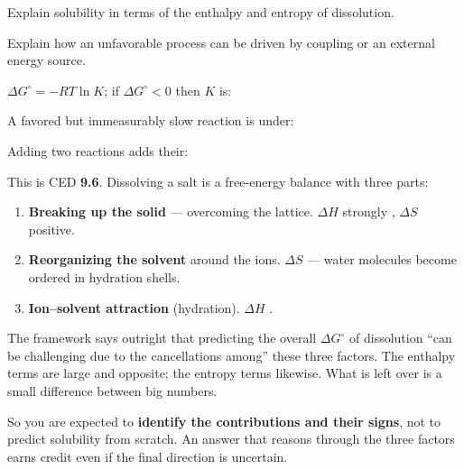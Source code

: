 \documentclass{apchem-notes}
\begin{document}

\begin{objectives}
  \item Explain solubility in terms of the enthalpy and entropy of
        dissolution.
  \item Explain how an unfavorable process can be driven by coupling or an
        external energy source.
\end{objectives}


\begin{warmup}[3]
  \item $\Delta G^\circ = -RT\ln K$; if $\Delta G^\circ < 0$ then $K$ is:
  \item A favored but immeasurably slow reaction is under:
  \item Adding two reactions adds their:
\end{warmup}



This is CED \textbf{9.6}. Dissolving a salt is a free-energy balance with
three parts:

\begin{enumerate}[leftmargin=*,itemsep=0.3em]
  \item \textbf{Breaking up the solid} --- overcoming the lattice.
        $\Delta H$ strongly ,
        $\Delta S$ positive.
  \item \textbf{Reorganizing the solvent} around the ions.
        $\Delta S$  --- water molecules become
        ordered in hydration shells.
  \item \textbf{Ion--solvent attraction} (hydration).
        $\Delta H$ .
\end{enumerate}

\begin{apcnote}
The framework says outright that predicting the overall $\Delta G^\circ$ of
dissolution ``can be challenging due to the cancellations among'' these
three factors. The enthalpy terms are large and opposite; the entropy terms
likewise. What is left over is a small difference between big numbers.

So you are expected to \textbf{identify the contributions and their signs},
not to predict solubility from scratch. An answer that reasons through the
three factors earns credit even if the final direction is uncertain.
\end{apcnote}
\end{document}
